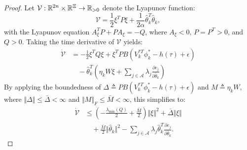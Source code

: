 \begin{proof}
Let $\mathcal{V}: \mathbb{R}^{2n} \times \mathbb{R}^{\Xi} \to \mathbb{R}_{>0}$ denote the Lyapunov function:
\begin{equation}
    \mathcal{V} = \frac{1}{2} \xi^T P \xi + \frac{1}{2 \alpha} \hat{\theta}_k^T \hat{\theta}_k,
\end{equation}
with the Lyapunov equation $A_\xi^T P + P A_\xi = -Q$, where $A_\xi < 0$, $P = P^T > 0$, and $Q > 0$.
Taking the time derivative of $\mathcal{V}$ yields:
\begin{equation}
    \begin{aligned}
        \dot{\mathcal{V}} 
        &= -\frac{1}{2} \xi^T Q \xi + \xi^T P B (V_k^{*T} \phi_k^* - h(\tau) + \epsilon) \\
        &\quad - \hat{\theta}_k^T \left( \eta_k W \xi + \sum_{j \in \mathcal{A}} \lambda_j \frac{\partial c_j}{\partial \hat{\theta}_k} \right)
    \end{aligned}
\end{equation}
By applying the boundedness of $\Delta \triangleq P B (V_k^{*T} \phi_k^* - h(\tau) + \epsilon)$ and $M \triangleq \eta_k W$, where $\Vert \Delta \Vert \leq \bar{\Delta} < \infty$ and $\Vert M \Vert_F \leq \bar{M} < \infty$, this simplifies to:
\begin{equation}
    \begin{aligned}
        \dot{\mathcal{V}} 
        &\leq \left( -\frac{\lambda_{\text{min}}(Q)}{2} + \frac{\bar{M}}{2} \right) \Vert \xi \Vert^2 + \bar{\Delta} \Vert \xi \Vert \\
        &\quad + \frac{\bar{M}}{2} \Vert \hat{\theta}_k \Vert^2 - \sum_{j \in \mathcal{A}} \lambda_j \hat{\theta}_k^T \frac{\partial c_j}{\partial \hat{\theta}_k}.
    \end{aligned}
    \label{chap4:eq:V1_dot}
\end{equation}


\end{proof}
